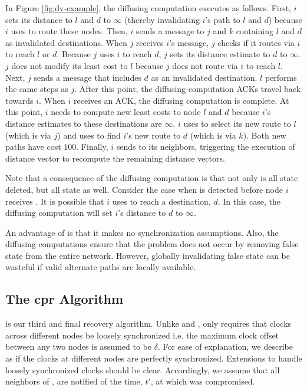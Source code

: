 
In Figure \ref{fig:dv-example}, the diffusing computation executes as follows. First, $i$ sets its distance to $l$ and $d$ to $\infty$ (thereby invalidating $i$'s path to $l$ and $d$)
because $i$ uses \bad to route these nodes. Then, $i$ sends a message to $j$ and $k$ containing $l$ and $d$ as invalidated destinations.
When $j$ receives $i$'s message, $j$ checks if it routes via $i$ to reach $l$ or $d$. Because $j$ uses $i$ to reach $d$, $j$ sets its distance estimate to $d$ to $\infty$. 
$j$ does not modify its least cost to $l$ because $j$ does not route via $i$ to reach $l$. Next, $j$ sends a message that includes $d$ as an invalidated destination.
$l$ performs the same steps as $j$. After this point, the diffusing computation ACKs travel back towards $i$. When $i$ receives an ACK, the diffusing computation is complete. At this
point, $i$ needs to compute new least costs to node $l$ and $d$ because $i$'s distance estimates to these destinations are $\infty$. 
$i$ uses \dmatrixi to select its new route to $l$ (which is via $j$) and uses \dmatrixi to find $i$'s new route to $d$ (which is via $k$). Both new paths have cost $100$. Finally,
$i$ sends \minvi to its neighbors, triggering the execution of distance vector to recompute the remaining distance vectors.

Note that a consequence of the diffusing computation is that not only is all \badvector state deleted, but all \oldvector state as well.  
Consider the case when \bad is detected before node $i$ receives \badvectors.
It is possible that $i$ uses \oldvector to reach a destination, $d$. In this case, the diffusing computation will set $i$'s distance to $d$ to $\infty$.

An advantage of \purge is that it makes no synchronization assumptions. Also, the diffusing computations ensure that the \infinity problem does not occur by removing
false state from the entire network. However, globally invalidating false state can be wasteful if valid alternate paths are locally available. 


\subsection{The cpr Algorithm}
\label{subsec:cpr}

is our third and final recovery algorithm. 
Unlike \second and \purges, \cpr only requires that clocks across different
nodes be loosely synchronized i.e. the maximum clock offset between
any two nodes is assumed to be $\delta$. For ease of explanation, we
describe \cpr as if the clocks at different nodes are perfectly
synchronized. Extensions to handle loosely synchronized clocks should
be clear. Accordingly, we assume that all neighbors of \bads, are
notified of the time, $t'$, at which \bad was compromised.


